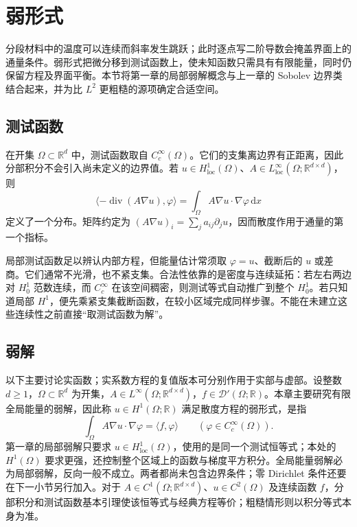 \section{弱形式}
\label{b2:sec:1501}

分段材料中的温度可以连续而斜率发生跳跃；此时逐点写二阶导数会掩盖界面上的通量条件。弱形式把微分移到测试函数上，使未知函数只需具有有限能量，同时仍保留方程及界面平衡。本节将第一章的局部弱解概念与上一章的 Sobolev 边界类结合起来，并为比 \(L^2\) 更粗糙的源项确定合适空间。

\subsection{测试函数}
\label{b2:subsec:150101}

在开集 \(\Omega\subset\mathbb R^d\) 中，测试函数取自 \(C_c^\infty(\Omega)\)。它们的支集离边界有正距离，因此分部积分不会引入尚未定义的边界值。若 \(u\in H_{\mathrm{loc}}^1(\Omega)\)、\(A\in L_{\mathrm{loc}}^\infty(\Omega;\mathbb R^{d\times d})\)，则
\[\langle-\operatorname{div}(A\nabla u),\varphi\rangle
 =\int_\Omega A\nabla u\cdot\nabla\varphi\,\mathrm dx\]
定义了一个分布。矩阵约定为 \((A\nabla u)_i=\sum_j a_{ij}\partial_j u\)，因而散度作用于通量的第一个指标。

\ProseParagraphBreak

局部测试函数足以辨认内部方程，但能量估计常须取 \(\varphi=u\)、截断后的 \(u\) 或差商。它们通常不光滑，也不紧支集。合法性依靠的是密度与连续延拓：若左右两边对 \(H_0^1\) 范数连续，而 \(C_c^\infty\) 在该空间稠密，则测试等式自动推广到整个 \(H_0^1\)。若只知道局部 \(H^1\)，便先乘紧支集截断函数，在较小区域完成同样步骤。不能在未建立这些连续性之前直接“取测试函数为解”。

\subsection{弱解}
\label{b2:subsec:150102}

以下主要讨论实函数；实系数方程的复值版本可分别作用于实部与虚部。设整数 \(d\geq1\)，\(\Omega\subset\mathbb R^d\) 为开集，\(A\in L^\infty(\Omega;\mathbb R^{d\times d})\)，\(f\in\mathcal D'(\Omega;\mathbb R)\)。本章主要研究有限全局能量的弱解，因此称 \(u\in H^1(\Omega;\mathbb R)\) 满足散度方程的弱形式，是指
\[\int_\Omega A\nabla u\cdot\nabla\varphi=\langle f,\varphi\rangle
 \qquad(\varphi\in C_c^\infty(\Omega)).\]
第一章的局部弱解只要求 \(u\in H_{\mathrm{loc}}^1(\Omega)\)，使用的是同一个测试恒等式；本处的 \(H^1(\Omega)\) 要求更强，还控制整个区域上的函数与梯度平方积分。全局能量弱解必为局部弱解，反向一般不成立。两者都尚未包含边界条件；零 Dirichlet 条件还要在下一小节另行加入。对于 \(A\in C^1(\Omega;\mathbb R^{d\times d})\)、\(u\in C^2(\Omega)\) 及连续函数 \(f\)，分部积分和测试函数基本引理使该恒等式与经典方程等价；粗糙情形则以积分等式本身为准。

